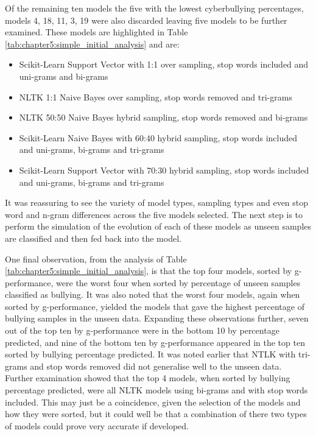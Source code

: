 Of the remaining ten models the five with the lowest cyberbullying percentages, models 4, 18, 11, 3, 19 were also discarded leaving five models to be further examined. These models are highlighted in Table \ref{tab:chapter5:simple_initial_analysis} and are:

\begin{itemize}

	\item Scikit-Learn Support Vector with 1:1 over sampling, stop words included and uni-grams and bi-grams
	\item NLTK 1:1 Naive Bayes over sampling, stop words removed and tri-grams
	\item NLTK 50:50 Naive Bayes hybrid sampling, stop words removed and bi-grams
	\item Scikit-Learn Naive Bayes with 60:40 hybrid sampling, stop words included and uni-grams, bi-grams and tri-grams
	\item Scikit-Learn Support Vector with 70:30 hybrid sampling, stop words included and uni-grams, bi-grams and tri-grams

\end{itemize}

It was reassuring to see the variety of model types, sampling types and even stop word and n-gram differences across the five models selected. The next step is to perform the simulation of the evolution of each of these models as unseen samples are classified and then fed back into the model.

One final observation, from the analysis of Table \ref{tab:chapter5:simple_initial_analysis}, is that the top four models, sorted by g-performance, were the worst four when sorted by percentage of unseen samples classified as bullying. It was also noted that the worst four models, again when sorted by g-performance, yielded the models that gave the highest percentage of bullying samples in the unseen data. Expanding these observations further, seven out of the top ten by g-performance were in the bottom 10 by percentage predicted, and nine of the bottom ten by g-performance appeared in the top ten sorted by bullying percentage predicted. It was noted earlier that NTLK with tri-grams and stop words removed did not generalise well to the unseen data. Further examination showed that the top 4 models, when sorted by bullying percentage predicted, were all NLTK models using bi-grams and with stop words included. This may just be a coincidence, given the selection of the models and how they were sorted, but it could well be that a combination of there two types of models could prove very accurate if developed.


